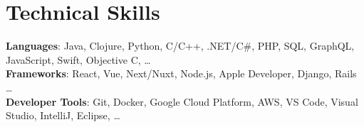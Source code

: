 \section{Technical Skills}\begin{itemize}[leftmargin=0.15in, label={}]
    \small{\item{
     \textbf{Languages}{: Java, Clojure, Python, C/C++, .NET/C\#, PHP, SQL, GraphQL, JavaScript, Swift, Objective C, …} \\
     \textbf{Frameworks}{: React, Vue, Next/Nuxt, Node.js, Apple Developer, Django, Rails …} \\
     \textbf{Developer Tools}{: Git, Docker, Google Cloud Platform, AWS, VS Code, Visual Studio, IntelliJ, Eclipse, …} \\
    }}
 \end{itemize}
